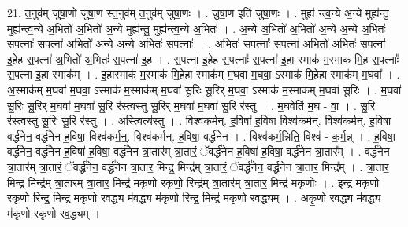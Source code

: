 \documentclass[17pt]{extarticle}
\begin{document}
21. त॒नुव॑म् जुषा॒णो जु॑षा॒ण स्त॒नुव॑म् त॒नुव॑म् जुषा॒णः । . जु॒षा॒ण इति॑ जुषा॒णः । . मुह्य॑ न्त्व॒न्ये अ॒न्ये मुह्य॑न्तु॒ मुह्य॑न्त्व॒न्ये अ॒भितो॑ अ॒भितो॑ अ॒न्ये मुह्य॑न्तु॒ मुह्य॑न्त्व॒न्ये अ॒भितः॑ । . अ॒न्ये अ॒भितो॑ अ॒भितो॑ अ॒न्ये अ॒न्ये अ॒भितः॑ स॒पत्नाः᳚ स॒पत्ना॑ अ॒भितो॑ अ॒न्ये अ॒न्ये अ॒भितः॑ स॒पत्नाः᳚ । . अ॒भितः॑ स॒पत्नाः᳚ स॒पत्ना॑ अ॒भितो॑ अ॒भितः॑ स॒पत्ना॑ इ॒हेह स॒पत्ना॑ अ॒भितो॑ अ॒भितः॑ स॒पत्ना॑ इ॒ह । . स॒पत्ना॑ इ॒हेह स॒पत्नाः᳚ स॒पत्ना॑ इ॒हा स्माक॑ म॒स्माक॑ मि॒ह स॒पत्नाः᳚ स॒पत्ना॑ इ॒हा स्माक᳚म् । . इ॒हास्माक॑ म॒स्माक॑ मि॒हेहा स्माक॑म् म॒घवा॑ म॒घवा॒ ऽस्माक॑ मि॒हेहा स्माक॑म् म॒घवा᳚ । . अ॒स्माक॑म् म॒घवा॑ म॒घवा॒ ऽस्माक॑ म॒स्माक॑म् म॒घवा॑ सू॒रिः सू॒रिर् म॒घवा॒ ऽस्माक॑ म॒स्माक॑म् म॒घवा॑ सू॒रिः । . म॒घवा॑ सू॒रिः सू॒रिर् म॒घवा॑ म॒घवा॑ सू॒रि र॑स्त्वस्तु सू॒रिर् म॒घवा॑ म॒घवा॑ सू॒रि र॑स्तु । . म॒घवेति॑ म॒घ - वा॒ । . सू॒रि र॑स्त्वस्तु सू॒रिः सू॒रि र॑स्तु । . अ॒स्त्वित्य॑स्तु । . विश्व॑कर्मन्. ह॒विषा॑ ह॒विषा॒ विश्व॑कर्म॒न्॒. विश्व॑कर्मन्. ह॒विषा॒ वर्द्ध॑नेन॒ वर्द्ध॑नेन ह॒विषा॒ विश्व॑कर्म॒न्॒. विश्व॑कर्मन्. ह॒विषा॒ वर्द्ध॑नेन । . विश्व॑कर्म॒न्निति॒ विश्व॑ - क॒र्म॒न्न् । . ह॒विषा॒ वर्द्ध॑नेन॒ वर्द्ध॑नेन ह॒विषा॑ ह॒विषा॒ वर्द्ध॑नेन त्रा॒तार॑म् त्रा॒तारं॒ ॅवर्द्ध॑नेन ह॒विषा॑ ह॒विषा॒ वर्द्ध॑नेन त्रा॒तार᳚म् । . वर्द्ध॑नेन त्रा॒तार॑म् त्रा॒तारं॒ ॅवर्द्ध॑नेन॒ वर्द्ध॑नेन त्रा॒तार॒ मिन्द्र॒ मिन्द्र॑म् त्रा॒तारं॒ ॅवर्द्ध॑नेन॒ वर्द्ध॑नेन त्रा॒तार॒ मिन्द्र᳚म् । . त्रा॒तार॒ मिन्द्र॒ मिन्द्र॑म् त्रा॒तार॑म् त्रा॒तार॒ मिन्द्र॑ मकृणो रकृणो॒ रिन्द्र॑म् त्रा॒तार॑म् त्रा॒तार॒ मिन्द्र॑ मकृणोः । . इन्द्र॑ मकृणो रकृणो॒ रिन्द्र॒ मिन्द्र॑ मकृणो रव॒द्ध्य म॑व॒द्ध्य म॑कृणो॒ रिन्द्र॒ मिन्द्र॑ मकृणो रव॒द्ध्यम् । . अ॒कृ॒णो॒ र॒व॒द्ध्य म॑व॒द्ध्य म॑कृणो रकृणो रव॒द्ध्यम् । \newline
\end{document}
